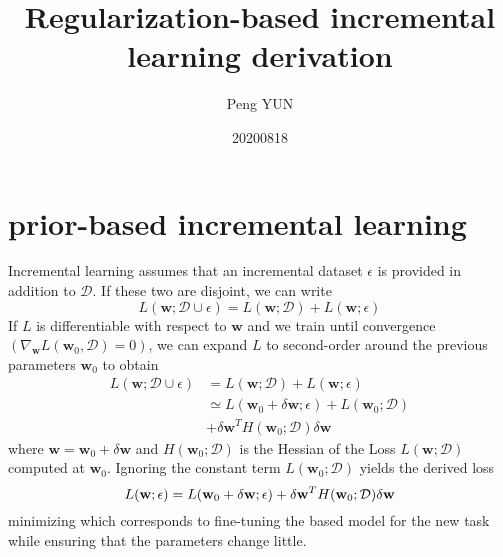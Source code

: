 \documentclass{article}
\title{Regularization-based incremental learning derivation}
\author{Peng YUN}
\date{20200818}
\begin{document}
\maketitle


\section{prior-based incremental learning \cite{Liu2020}}

Incremental learning assumes that an incremental dataset $\mathcal \epsilon$
is provided in addition to $\mathcal D$.
If these two are disjoint,
we can write
\begin{equation}
    L(\mathbf w; \mathcal D \cup \mathcal \epsilon) = L(\mathbf w; \mathcal D) +  L(\mathbf w; \mathcal \epsilon)
\end{equation}
If $L$ is differentiable with respect to $\mathbf w$ and we train until convergence 
$(\nabla_{\mathbf w} L(\mathbf w_0, \mathcal D) = 0)$, we can expand $L$ to second-order around the previous parameters $\mathbf w_0$
to obtain
\begin{equation}
    \begin{split}
        L(\mathbf w; \mathcal D \cup \mathcal \epsilon) &= L(\mathbf w; \mathcal D) +  L(\mathbf w; \mathcal \epsilon)\\
        &\simeq L(\mathbf w_0+\delta \mathbf w;\mathcal \epsilon) + L(\mathbf w_0;\mathcal D)\\
        &+\delta \mathbf w^TH(\mathbf w_0;\mathcal D)\delta \mathbf w
    \end{split}
\end{equation}
where $\mathbf w = \mathbf w_0 + \delta \mathbf w$ and $H(\mathbf w_0; \mathcal D)$ is the Hessian of the Loss $L(\mathbf w; \mathcal D)$
computed at $\mathbf w_0$. Ignoring the constant term $L(\mathbf w_0; \mathcal D)$ yields the derived loss
\begin{equation}
    \label{eq:loss_reg}
    L(\mathbf w; \mathcal \epsilon) = L(\mathbf w_0+\delta \mathbf w;\mathcal \epsilon) \\
    +\delta \mathbf w^TH(\mathbf w_0;\mathcal D)\delta \mathbf w
\end{equation}
minimizing which corresponds to fine-tuning the based model for the new task while ensuring that 
the parameters change little.
\end{document}
